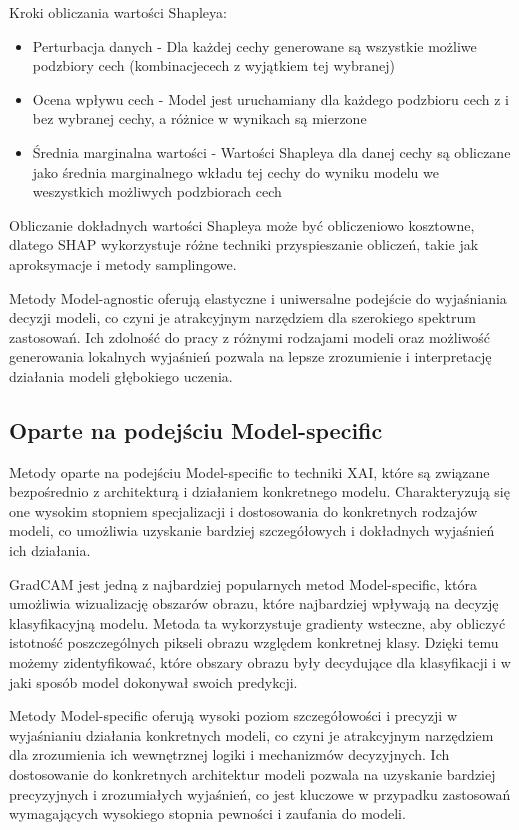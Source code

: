 Kroki obliczania wartości Shapleya:
\begin{itemize}
	\item Perturbacja danych - Dla każdej cechy generowane są wszystkie możliwe podzbiory cech (kombinacjecech z wyjątkiem tej wybranej)
	\item Ocena wpływu cech - Model jest uruchamiany dla każdego podzbioru cech z i bez wybranej cechy, a różnice w wynikach są mierzone
	\item Średnia marginalna wartości - Wartości Shapleya dla danej cechy są obliczane jako średnia marginalnego wkładu tej cechy do wyniku modelu we weszystkich możliwych podzbiorach cech
\end{itemize}

Obliczanie dokładnych wartości Shapleya może być obliczeniowo kosztowne, dlatego SHAP wykorzystuje różne techniki przyspieszanie obliczeń, takie jak aproksymacje i metody samplingowe.

\vspace{1cm}
Metody Model-agnostic oferują elastyczne i uniwersalne podejście do wyjaśniania decyzji modeli, co czyni je atrakcyjnym narzędziem dla szerokiego spektrum zastosowań. Ich zdolność do pracy z różnymi rodzajami modeli oraz możliwość generowania lokalnych wyjaśnień pozwala na lepsze zrozumienie i interpretację działania modeli głębokiego uczenia.

\subsection*{Oparte na podejściu Model-specific}
Metody oparte na podejściu Model-specific to techniki XAI, które są związane bezpośrednio z architekturą i działaniem konkretnego modelu. Charakteryzują się one wysokim stopniem specjalizacji i dostosowania do konkretnych rodzajów modeli, co umożliwia uzyskanie bardziej szczegółowych i dokładnych wyjaśnień ich działania.

GradCAM jest jedną z najbardziej popularnych metod Model-specific, która umożliwia wizualizację obszarów obrazu, które najbardziej wpływają na decyzję klasyfikacyjną modelu. Metoda ta wykorzystuje gradienty wsteczne, aby obliczyć istotność poszczególnych pikseli obrazu względem konkretnej klasy. Dzięki temu możemy zidentyfikować, które obszary obrazu były decydujące dla klasyfikacji i w jaki sposób model dokonywał swoich predykcji.

Metody Model-specific oferują wysoki poziom szczegółowości i precyzji w wyjaśnianiu działania konkretnych modeli, co czyni je atrakcyjnym narzędziem dla zrozumienia ich wewnętrznej logiki i mechanizmów decyzyjnych. Ich dostosowanie do konkretnych architektur modeli pozwala na uzyskanie bardziej precyzyjnych i zrozumiałych wyjaśnień, co jest kluczowe w przypadku zastosowań wymagających wysokiego stopnia pewności i zaufania do modeli.


